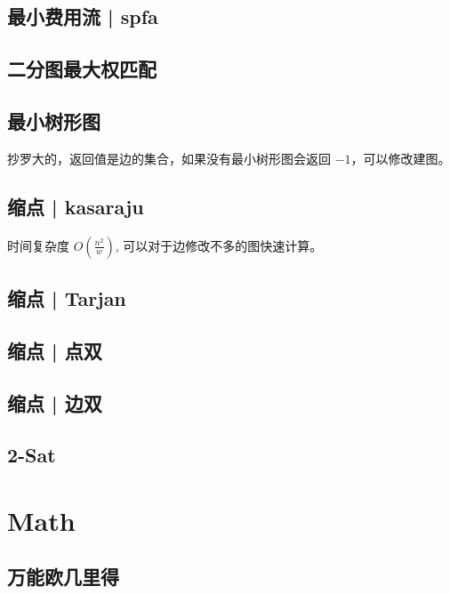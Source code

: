 \documentclass{article}
\begin{document}
\subsection{最小费用流 | spfa}

\newpage

\subsection{二分图最大权匹配} %

\newpage

\subsection{最小树形图}
抄罗大的，返回值是边的集合，如果没有最小树形图会返回 $-1$，可以修改建图。

\newpage

\subsection{缩点 | kasaraju}
时间复杂度 $O(\frac{n^2}{w})$, 可以对于边修改不多的图快速计算。

\newpage

\subsection{缩点 | Tarjan} %


\subsection{缩点 | 点双} %


\subsection{缩点 | 边双} %


\subsection{2-Sat}

\newpage


\section{Math}	

\subsection{万能欧几里得}

\newpage
\end{document}
